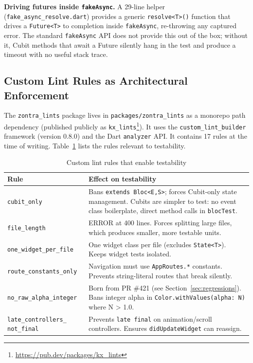 \documentclass[10pt,journal,compsoc]{IEEEtran}
\begin{document}
\textbf{Driving futures inside \texttt{fakeAsync}.}
A 29-line helper (\texttt{fake\_async\_resolve.dart}) provides a generic
\texttt{resolve<T>()} function that drives a \texttt{Future<T>} to
completion inside \texttt{fakeAsync}, re-throwing any captured error. The
standard \texttt{fakeAsync} API does not provide this out of the box;
without it, Cubit methods that await a Future silently hang in the test
and produce a timeout with no useful stack trace.

\subsection{Custom Lint Rules as Architectural Enforcement}
\label{sec:lints}

The \texttt{zontra\_lints} package lives in \texttt{packages/zontra\_lints}
as a monorepo path dependency (published publicly as
\texttt{kx\_lints}\footnote{\url{https://pub.dev/packages/kx\_lints}}).
It uses the \texttt{custom\_lint\_builder}
framework (version 0.8.0) and the Dart \texttt{analyzer} API. It contains
17 rules at the time of writing. Table~\ref{tab:lints} lists the rules
relevant to testability.

\begin{table}[h]
\caption{Custom lint rules that enable testability}
\label{tab:lints}
\small
\begin{tabular}{@{}p{3.8cm}p{4.5cm}@{}}
\toprule
Rule & Effect on testability \\
\midrule
\texttt{cubit\_only} & Bans \texttt{extends Bloc<E,S>}; forces Cubit-only
  state management. Cubits are simpler to test: no event
  class boilerplate, direct method calls in \texttt{blocTest}. \\
\texttt{file\_length} & ERROR at 400 lines. Forces splitting large files,
  which produces smaller, more testable units. \\
\texttt{one\_widget\_per\_file} & One widget class per file (excludes
  \texttt{State<T>}). Keeps widget tests isolated. \\
\texttt{route\_constants\_only} & Navigation must use \texttt{AppRoutes.*}
  constants. Prevents string-literal routes that break silently. \\
\texttt{no\_raw\_alpha\_integer} & Born from PR \#421 (see
  Section~\ref{sec:regressions}). Bans integer alpha in
  \texttt{Color.withValues(alpha: N)} where N > 1.0. \\
\texttt{late\_controllers\_} \texttt{not\_final} & Prevents \texttt{late final} on
  animation/scroll controllers. Ensures \texttt{didUpdateWidget} can
  reassign. \\
\bottomrule
\end{tabular}
\end{table}
\end{document}
